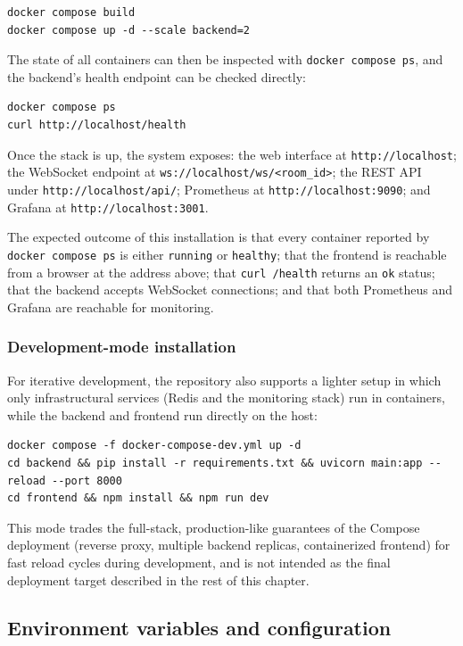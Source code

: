 \documentclass{scrartcl}
\begin{document}
\begin{verbatim}
docker compose build
docker compose up -d --scale backend=2
\end{verbatim}

The state of all containers can then be inspected with \texttt{docker compose ps}, and the backend's health endpoint can be checked directly:

\begin{verbatim}
docker compose ps
curl http://localhost/health
\end{verbatim}

Once the stack is up, the system exposes: the web interface at \texttt{http://localhost}; the WebSocket endpoint at \texttt{ws://localhost/ws/<room\_id>}; the REST API under \texttt{http://localhost/api/}; Prometheus at \texttt{http://localhost:9090}; and Grafana at \texttt{http://localhost:3001}.

The expected outcome of this installation is that every container reported by \texttt{docker compose ps} is either \texttt{running} or \texttt{healthy}; that the frontend is reachable from a browser at the address above; that \texttt{curl /health} returns an \texttt{ok} status; that the backend accepts WebSocket connections; and that both Prometheus and Grafana are reachable for monitoring.

\subsubsection{Development-mode installation}

For iterative development, the repository also supports a lighter setup in which only infrastructural services (Redis and the monitoring stack) run in containers, while the backend and frontend run directly on the host:

\begin{verbatim}
docker compose -f docker-compose-dev.yml up -d
cd backend && pip install -r requirements.txt && uvicorn main:app --reload --port 8000
cd frontend && npm install && npm run dev
\end{verbatim}

This mode trades the full-stack, production-like guarantees of the Compose deployment (reverse proxy, multiple backend replicas, containerized frontend) for fast reload cycles during development, and is not intended as the final deployment target described in the rest of this chapter.

\subsection{Environment variables and configuration}
\end{document}
